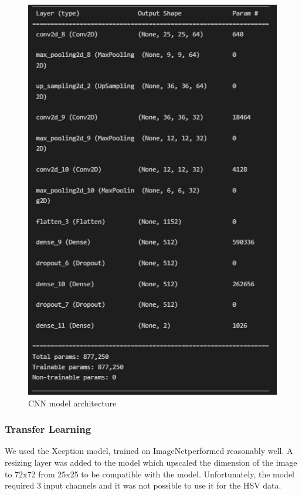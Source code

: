 \documentclass[10pt,twocolumn,letterpaper]{article}
\begin{document}
\begin{figure}[t]
   \begin{center}
      \includegraphics[width=1\linewidth]{../Plots/model_specifications.png}
   \end{center}
      \caption{CNN model architecture}
   \label{fig:cnn_architecture}
\end{figure}

\subsubsection{Transfer Learning}
We used the Xception model, trained on ImageNetperformed reasonably well. A resizing layer was added to the model which upscaled the dimension of the image to 72x72 from 25x25 to be compatible with the model. Unfortunately, the model required 3 input channels and it was not possible to use it for the HSV data.
\end{document}
